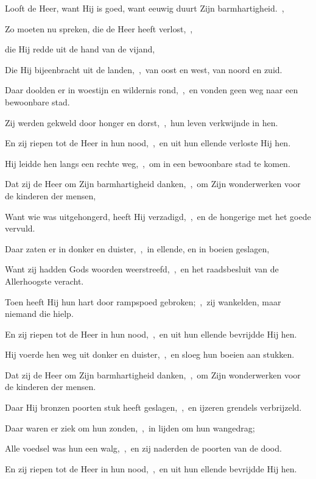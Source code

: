 \documentclass[12pt,twoside,a5paper]{article}
\begin{document}
\begin{halfparskip}
   Looft de Heer, want Hij is goed, want eeuwig duurt Zijn barmhartigheid.~\sep

  Zo moeten nu spreken, die de Heer heeft verlost,~\sep


  die Hij redde uit de hand van de vijand,

  Die Hij bijeenbracht uit de landen,~\sep\ van oost en west, van noord en zuid.

  Daar doolden er in woestijn en wildernis rond,~\sep\ en vonden geen weg naar een bewoonbare stad.

  Zij werden gekweld door honger en dorst,~\sep\ hun leven verkwijnde in hen.

  En zij riepen tot de Heer in hun nood,~\sep\ en uit hun ellende verloste Hij hen.

  Hij leidde hen langs een rechte weg,~\sep\ om in een bewoonbare stad te komen.

  Dat zij de Heer om Zijn barmhartigheid danken,~\sep\ om Zijn wonderwerken voor de kinderen der mensen,

  Want wie was uitgehongerd, heeft Hij verzadigd,~\sep\ en de hongerige met het goede vervuld.

  Daar zaten er in donker en duister,~\sep\ in ellende, en in boeien geslagen,

  Want zij hadden Gods woorden weerstreefd,~\sep\ en het raadsbesluit van de Allerhoogste veracht.

  Toen heeft Hij hun hart door rampspoed gebroken;~\sep\ zij wankelden, maar niemand die hielp.

  En zij riepen tot de Heer in hun nood,~\sep\ en uit hun ellende bevrijdde Hij hen.

  Hij voerde hen weg uit donker en duister,~\sep\ en sloeg hun boeien aan stukken.

  Dat zij de Heer om Zijn barmhartigheid danken,~\sep\ om Zijn wonderwerken voor de kinderen der mensen.

  Daar Hij bronzen poorten stuk heeft geslagen,~\sep\ en ijzeren grendels verbrijzeld.

  Daar waren er ziek om hun zonden,~\sep\ in lijden om hun wangedrag;

  Alle voedsel was hun een walg,~\sep\ en zij naderden de poorten van de dood.

  En zij riepen tot de Heer in hun nood,~\sep\ en uit hun ellende bevrijdde Hij hen.


\end{halfparskip}
\end{document}
